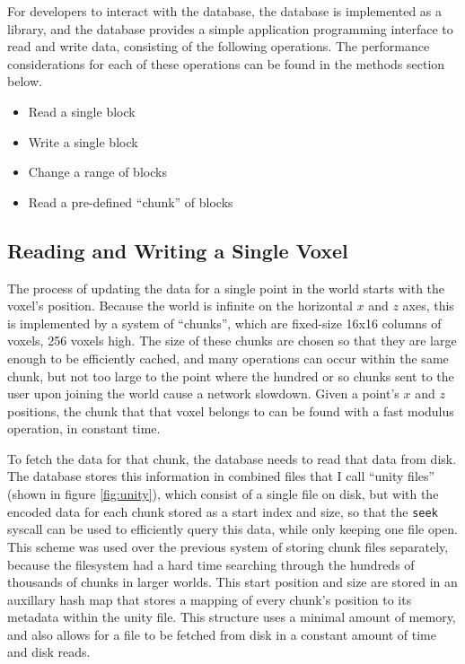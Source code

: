 \documentclass[10pt,twocolumn]{article}
\begin{document}
For developers to interact with the database, the database is implemented as a
library, and the database provides a simple application programming interface to
read and write data, consisting of the following operations. The performance
considerations for each of these operations can be found in the methods section
below.

\begin{itemize}
  \item Read a single block
  \item Write a single block
  \item Change a range of blocks
  \item Read a pre-defined ``chunk'' of blocks
\end{itemize}

\subsection{Reading and Writing a Single Voxel}

The process of updating the data for a single point in the world starts with the
voxel's position. Because the world is infinite on the horizontal $x$ and $z$
axes, this is implemented by a system of ``chunks'', which are fixed-size 16x16
columns of voxels, 256 voxels high. The size of these chunks are chosen so that
they are large enough to be efficiently cached, and many operations can occur
within the same chunk, but not too large to the point where the hundred or so
chunks sent to the user upon joining the world cause a network slowdown. Given a
point's $x$ and $z$ positions, the chunk that that voxel belongs to can be found
with a fast modulus operation, in constant time.

To fetch the data for that chunk, the database needs to read that data from
disk. The database stores this information in combined files that I call ``unity
files'' (shown in figure \ref{fig:unity}), which consist of a single file on disk, but with the encoded data for
each chunk stored as a start index and size, so that the \verb|seek| syscall can
be used to efficiently query this data, while only keeping one file open. This
scheme was used over the previous system of storing chunk files separately,
because the filesystem had a hard time searching through the hundreds of
thousands of chunks in larger worlds. This start position and size are stored in
an auxillary hash map that stores a mapping of every chunk's position to its
metadata within the unity file. This structure uses a minimal amount of memory,
and also allows for a file to be fetched from disk in a constant amount of time
and disk reads.
\end{document}
